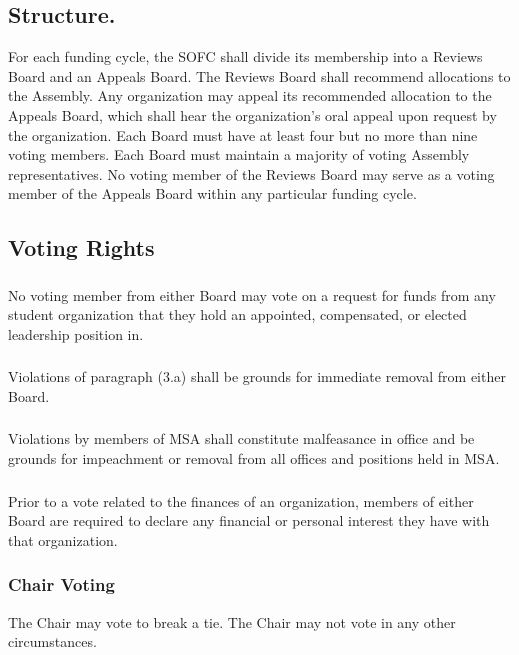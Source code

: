 \subsection{Structure.}
For each funding cycle, the SOFC shall divide its membership into a Reviews Board and an Appeals Board.  The Reviews Board shall recommend allocations to the Assembly.  Any organization may appeal its recommended allocation to the Appeals Board, which shall hear the organization's oral appeal upon request by the organization.  Each Board must have at least four but no more than nine voting members.  Each Board must maintain a majority of voting Assembly representatives.  No voting member of the Reviews Board may serve as a voting member of the Appeals Board within any particular funding cycle.

\subsection{Voting Rights}
\subsubsection{}
No voting member from either Board may vote on a request for funds from any student organization that they hold an appointed, compensated, or elected leadership position in.
\subsubsection{}
Violations of paragraph (3.a) shall be grounds for immediate removal from either Board.
\subsubsection{}
Violations by members of MSA shall constitute malfeasance in office and be grounds for impeachment or removal from all offices and positions held in MSA.
\subsubsection{}
Prior to a vote related to the finances of an organization, members of either Board are required to declare any financial or personal interest they have with that organization.
\subsubsection{Chair Voting}
\subsubsubsection{}
The Chair may vote to break a tie.
\subsubsubsection{}
The Chair may not vote in any other circumstances.

